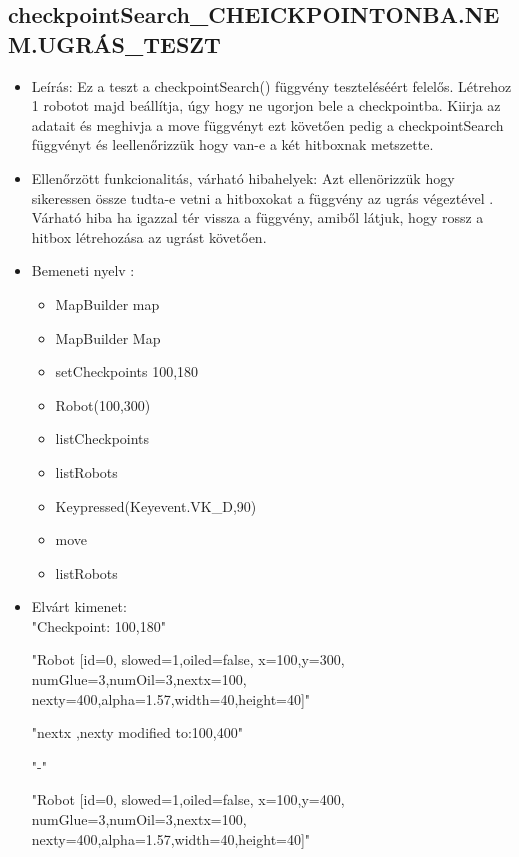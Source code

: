 \subsection{checkpointSearch\_CHEICKPOINTONBA.NEM.UGRÁS\_TESZT}
\begin{itemize}
	\item Leírás: Ez a teszt a checkpointSearch() függvény teszteléséért felelős.
			Létrehoz 1 robotot majd beállítja, úgy hogy ne ugorjon bele a checkpointba.
			Kiirja az adatait  és meghivja a move függvényt ezt követően pedig a checkpointSearch függvényt és leellenőrizzük hogy van-e a két hitboxnak metszette.\newline
	\item Ellenőrzött funkcionalitás, várható hibahelyek: Azt ellenörizzük hogy sikeressen össze tudta-e vetni a hitboxokat a függvény az ugrás                     végeztével .
	        Várható hiba ha igazzal tér vissza a függvény, amiből látjuk, hogy rossz a hitbox létrehozása  az ugrást követően.
	\item Bemeneti nyelv :
		\begin{itemize}
\item MapBuilder map
        \item MapBuilder Map
        \item setCheckpoints 100,180
		\item Robot(100,300)
		\item listCheckpoints
		\item listRobots
		\item Keypressed(Keyevent.VK\_D,90)
		\item move
		\item listRobots
		\end{itemize}

	\item Elvárt kimenet: \\
	    "Checkpoint: 100,180"\newline
	    
		"Robot [id=0,  slowed=1,oiled=false, x=100,y=300, 
		\\numGlue=3,numOil=3,nextx=100,
		\\nexty=400,alpha=1.57,width=40,height=40]"\newline
		
		"nextx ,nexty modified to:100,400"\newline
		
		 "-"\newline
	
		 "Robot [id=0,  slowed=1,oiled=false, x=100,y=400, 
		\\numGlue=3,numOil=3,nextx=100,
		\\nexty=400,alpha=1.57,width=40,height=40]"\newline
	
\end{itemize}






